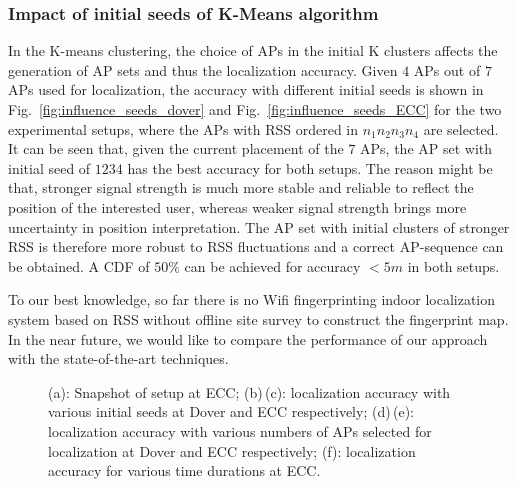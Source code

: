 \documentclass[10pt, conference, letterpaper]{IEEEtran}
\begin{document}
\subsubsection{Impact of initial seeds of K-Means algorithm}
In the K-means clustering, the choice of APs in the initial K clusters affects the generation of AP sets and thus the localization accuracy. 
Given $4$ APs out of $7$ APs used for localization, the accuracy with different initial seeds is shown in Fig.~\ref{fig:influence_seeds_dover} and Fig.~\ref{fig:influence_seeds_ECC} for the two experimental setups, 
where the APs with RSS ordered in $n_1n_2n_3n_4$ are selected. 
It can be seen that, given the current placement of the $7$ APs, the AP set with initial seed of $1234$ has the best accuracy for both setups.
The reason might be that, stronger signal strength is much more stable and reliable to reflect the position of the interested user, 
whereas weaker signal strength brings more uncertainty in position interpretation. 
The AP set with initial clusters of stronger RSS is therefore more robust to RSS fluctuations and a correct AP-sequence can be obtained. 
A CDF of $50\%$ can be achieved for accuracy $<5m$ in both setups.

To our best knowledge, so far there is no Wifi fingerprinting indoor localization system based on RSS without offline site survey to construct the fingerprint map. 
In the near future, we would like to compare the performance of our approach with the state-of-the-art techniques.

\begin{figure*}
  \centering
   \caption[Mean Localization Accuracy under the Impact of the numbers of the slected APs.]
{(a): Snapshot of setup at ECC;
(b)\,(c): localization accuracy with various initial seeds at Dover and ECC respectively;
(d)\,(e): localization accuracy with various numbers of APs selected for localization at Dover and ECC respectively; 
(f): localization accuracy for various time durations at ECC.
}
\label{fig:experimental_results}
\vspace{-0.15in}
\end{figure*}
\end{document}
